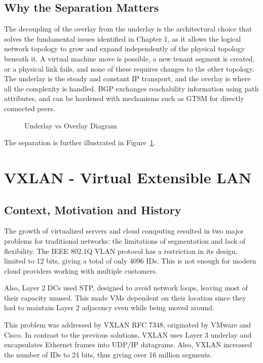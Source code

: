 \subsection{Why the Separation Matters}
The decoupling of the overlay from the underlay is the architectural choice that solves the fundamental issues identified in Chapter 1, as it allows the logical network topology to grow and expand independently of the physical topology beneath it\cite{IETFRFC8365}. A virtual machine move is possible, a new tenant segment is created, or a physical link fails, and none of these requires changes to the other topology. The underlay is the steady and constant IP transport, and the overlay is where all the complexity is handled.
BGP exchanges reachability information using path attributes, and can be hardened with mechanisms such as GTSM for directly connected peers\cite{IETFRFC4271,IETFRFC5082,Cisco_Nexus_9000_BGP_Configuration_Guide}.

\begin{figure}[!htbp]
    \centering
    \underoverlay
    \caption{Underlay vs Overlay Diagram}
    \label{fig:underlay-overlay-diagram}
\end{figure}
The separation is further illustrated in Figure~\ref{fig:underlay-overlay-diagram}.

\section{VXLAN - Virtual Extensible LAN}
\subsection{Context, Motivation and History}
The growth of virtualized servers and cloud computing resulted in two major problems for traditional networks: the limitations of segmentation and lack of flexibility. The IEEE 802.1Q VLAN protocol has a restriction in its design, limited to 12 bits, giving a total of only 4096 IDs. This is not enough for modern cloud providers working with multiple customers.

Also, Layer 2 DCs used STP, designed to avoid network loops, leaving most of their capacity unused. This made VMs dependent on their location since they had to maintain Layer 2 adjacency even while being moved around.

This problem was addressed by VXLAN RFC 7348\cite{IET_RFC_7348}, originated by VMware and Cisco. In contrast to the previous solutions, VXLAN uses Layer 3 underlay and encapsulates Ethernet frames into UDP/IP datagrams. Also, VXLAN increased the number of IDs to 24 bits, thus giving over 16 million segments.

